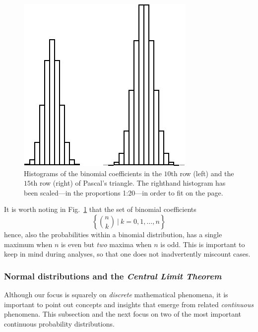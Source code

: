 \begin{figure}[htb]
\begin{center}
        \includegraphics[scale=0.5]{FiguresMaths/ProbaGaussianDistribution}
        \caption{Histograms of the binomial coefficients in the $10$th row (left) and the $15$th row (right) of Pascal's triangle.  The righthand histogram has been scaled---in the proportions 1:20---in order to fit on the page.}
        \label{fig:gaussiandistribution}
\end{center}
\end{figure}

It is worth noting in Fig.~\ref{fig:gaussiandistribution} that the set of binomial coefficients
\[ \left\{ {n \choose k} \ | \ k = 0, 1, \ldots, n \right\} \]
hence, also the probabilities within a binomial distribution, has a single maximum when $n$ is even but {\em two} maxima when $n$ is odd.  This is important to keep in mind during analyses, so that one does not inadvertently miscount cases.


\subsubsection{Normal distributions and the {\em Central Limit Theorem}} 
\label{sec:normal-distr}

  
 

Although our focus is squarely on {\em discrete} mathematical phenomena, it is important to point out concepts and insights that emerge from related {\em continuous} phenomena.  This subsection and the next focus on two of the most important continuous probability distributions.

